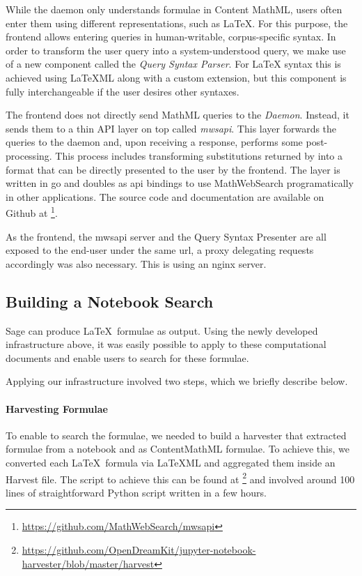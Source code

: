 While the \MWS daemon only understands formulae in Content MathML, users often enter them using different representations, such as \LaTeX. 
For this purpose, the frontend allows entering queries in human-writable, corpus-specific syntax. 
In order to transform the user query into a system-understood query, we make use of a new component called the \textit{Query Syntax Parser}. 
For {\LaTeX} syntax this is achieved using {\LaTeX}ML along with a custom \MWS extension, but this component is fully interchangeable if the user desires other syntaxes. 

The frontend does not directly send MathML queries to the \textit{Daemon}.
Instead, it sends them to a thin API layer on top called \textit{mwsapi}. 
This layer forwards the queries to the daemon and, upon receiving a response, performs some post-processing. 
This process includes transforming substitutions returned by \MWS into a format that can be directly presented to the user by the frontend. 
The layer is written in go and doubles as api bindings to use MathWebSearch programatically in other applications. 
The source code and documentation are available on Github at \footnote{\url{https://github.com/MathWebSearch/mwsapi}}. 

As the frontend, the mwsapi server and the Query Syntax Presenter are all exposed to the end-user under the same url, a proxy delegating requests accordingly was also necessary. 
This is using an nginx server. 

\subsection{Building a Notebook Search}

Sage can produce \LaTeX\ formulae as output.
Using the newly developed infrastructure above, it was easily possible to apply \MWS to these computational documents and enable users to search for these formulae. 

Applying our infrastructure involved two steps, which we briefly describe below.

\paragraph{Harvesting Formulae}
To enable \MWS to search the formulae, we needed to build a harvester that extracted formulae from a notebook and as ContentMathML formulae. 
To achieve this, we converted each \LaTeX\ formula via LaTeXML and aggregated them inside an \MWS Harvest file. 
The script to achieve this can be found at \footnote{\url{https://github.com/OpenDreamKit/jupyter-notebook-harvester/blob/master/harvest}} and involved around 100 lines of straightforward Python script written in a few hours. 

